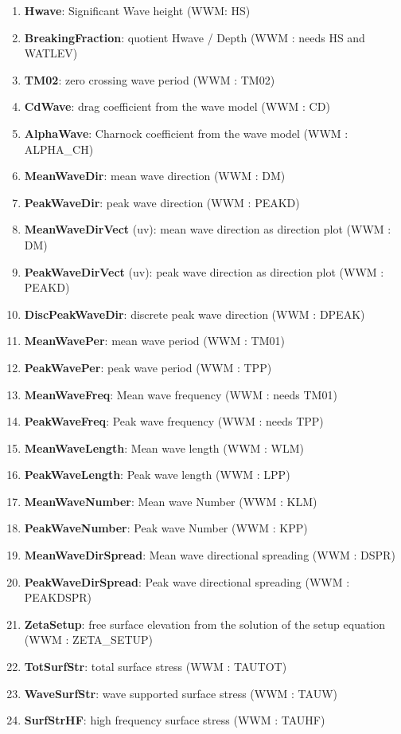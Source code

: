 \documentclass[12pt]{amsart}
\begin{document}
\begin{enumerate}
\item {\bf Hwave}: Significant Wave height (WWM: HS)
\item {\bf BreakingFraction}: quotient Hwave / Depth (WWM : needs HS and WATLEV)
\item {\bf TM02}: zero crossing wave period (WWM : TM02)
\item {\bf CdWave}: drag coefficient from the wave model (WWM : CD)
\item {\bf AlphaWave}: Charnock coefficient from the wave model (WWM : ALPHA\_CH)
\item {\bf MeanWaveDir}: mean wave direction (WWM : DM)
\item {\bf PeakWaveDir}: peak wave direction (WWM : PEAKD)
\item {\bf MeanWaveDirVect} (uv): mean wave direction as direction plot (WWM : DM)
\item {\bf PeakWaveDirVect} (uv): peak wave direction as direction plot (WWM : PEAKD)
\item {\bf DiscPeakWaveDir}: discrete peak wave direction (WWM : DPEAK)
\item {\bf MeanWavePer}: mean wave period (WWM : TM01)
\item {\bf PeakWavePer}: peak wave period (WWM : TPP)
\item {\bf MeanWaveFreq}: Mean wave frequency (WWM : needs TM01)
\item {\bf PeakWaveFreq}: Peak wave frequency (WWM : needs TPP)
\item {\bf MeanWaveLength}: Mean wave length (WWM : WLM)
\item {\bf PeakWaveLength}: Peak wave length (WWM : LPP)
\item {\bf MeanWaveNumber}: Mean wave Number (WWM : KLM)
\item {\bf PeakWaveNumber}: Peak wave Number (WWM : KPP)
\item {\bf MeanWaveDirSpread}: Mean wave directional spreading (WWM : DSPR)
\item {\bf PeakWaveDirSpread}: Peak wave directional spreading (WWM : PEAKDSPR)
\item {\bf ZetaSetup}: free surface elevation from the solution of the setup equation (WWM : ZETA\_SETUP)
\item {\bf TotSurfStr}: total surface stress (WWM : TAUTOT)
\item {\bf WaveSurfStr}: wave supported surface stress (WWM : TAUW)
\item {\bf SurfStrHF}: high frequency surface stress (WWM : TAUHF)
\end{enumerate}
\end{document}
